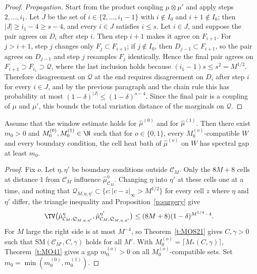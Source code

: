 \begin{proof}
\emph{Propagation.} Start from the product coupling $\mu \otimes \mu'$ and apply steps $2, \dots, i_1$. Let $J$ be the set of $i \in \{2, \dots, i_1 - 1\}$ with $i \notin I_0$ and $i + 1 \notin I_0$; then $|J| \ge i_1 - 4 \ge s - 4$, and every $i \in J$ satisfies $i \le s$. Let $i \in J$, and suppose the pair agrees on $D_i$ after step $i$. Then step $i + 1$ makes it agree on $F_{i + 1}$. For $j > i + 1$, step $j$ changes only $F_j \subset F_{i + 1}$; if $j \notin I_0$, then $D_{j - 1} \subset F_{i + 1}$, so the pair agrees on $D_{j - 1}$ and step $j$ resamples $F_j$ identically. Hence the final pair agrees on $F_{i + 1} \supset F_{i_1} \supset \mathcal Q$, where the last inclusion holds because $(i_1 - 1) s \le s^2 = M^{1/2}$. Therefore disagreement on $\mathcal Q$ at the end requires disagreement on $D_i$ after step $i$ for every $i \in J$, and by the previous paragraph and the chain rule this has probability at most $(1 - \delta)^{|J|} \le (1 - \delta)^{s - 4}$. Since the final pair is a coupling of $\mu$ and $\mu'$, this bounds the total variation distance of the marginals on $\mathcal Q$.
\end{proof}

\begin{corollary}\label{c:gapcell}
Assume that the window estimate holds for $\hat\mu^{(0)}$ and for $\hat\mu^{(1)}$. Then there exist $m_0 > 0$ and $M_0^{(0)}, M_0^{(1)} \in \N$ such that for $o \in \{0, 1\}$, every $M_0^{(o)}$-compatible $W$ and every boundary condition, the cell heat bath of $\hat\mu^{(o)}$ on $W$ has spectral gap at least $m_0$.
\end{corollary}

\begin{proof}
Fix $o$. Let $\eta, \eta'$ be boundary conditions outside $\mathcal C_M$. Only the $8M + 8$ cells at distance $1$ from $\mathcal C_M$ influence $\hat\mu^\eta_{\mathcal C_M}$. Changing $\eta$ into $\eta'$ at these cells one at a time, and noting that $\mathcal Q_{M, \eta, \eta'} \subset \{ c : |c - z|_\infty > M^{1/2}\}$ for every cell $z$ where $\eta$ and $\eta'$ differ, the triangle inequality and Proposition~\ref{p:surgery} give
\begin{equation*}
\TV\bigl( \hat\mu^\eta_{\mathcal C_M, \mathcal Q_{M, \eta, \eta'}}, \hat\mu^{\eta'}_{\mathcal C_M, \mathcal Q_{M, \eta, \eta'}} \bigr) \le (8M + 8) (1 - \delta)^{M^{1/4} - 4} .
\end{equation*}
For $M$ large the right side is at most $M^{-4}$, so Theorem~\ref{t:MOS21} gives $C, \gamma > 0$ such that $\mathrm{SM}(\mathcal C_{M'}, C, \gamma)$ holds for all $M'$. With $M_0^{(o)} = \lceil M_*(C, \gamma) \rceil$, Theorem~\ref{t:MO41} gives a gap $m_0^{(o)} > 0$ on all $M_0^{(o)}$-compatible sets. Set $m_0 = \min(m_0^{(0)}, m_0^{(1)})$.
\end{proof}

